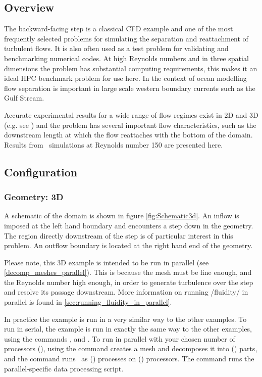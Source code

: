 \subsection{Overview}
The backward-facing step is a classical CFD example and one of the most frequently selected
problems for simulating the separation and reattachment of turbulent flows.
It is also often used as a test problem for validating and benchmarking numerical codes.
At high Reynolds numbers and in three spatial dimensions the problem has substantial
computing requirements, this makes it an ideal HPC benchmark problem for use here.
In the context of ocean modelling flow separation is important
in large scale western boundary currents such as the Gulf Stream.

Accurate experimental results for a wide range of flow regimes exist
in 2D and 3D
(e.g. see \cite{armaly1983}) and the problem has several important flow
characteristics, such as the downstream length at which the flow reattaches
with the bottom of the domain. Results from \fluidity\ simulations at Reynolds number 150
are presented here.


\subsection{Configuration}
\subsubsection{Geometry: 3D}
A schematic of the domain is shown in figure \ref{fig:Schematic3d}.
An inflow is imposed at the left hand boundary and encounters a step
down in the geometry. The region directly downstream of the step is
of particular interest in this problem. An outflow boundary is located at the
right hand end of the geometry.

Please note, this 3D example is intended to be run in parallel (see \ref{decomp_meshes_parallel}).
This is because the mesh must be fine enough, and the Reynolds number high enough, in order to
generate turbulence over the step and resolve its passage downstream. More information on running
/fluidity/ in parallel is found in \ref{sec:running_fluidity_in_parallel}.

In practice the example is run in a very similar way to the other examples.
To run in serial, the example is run in exactly the same way to the other examples, using
the commands ,  and .
To run in parallel with your chosen number of processors (), using the command
 creates a mesh and decomposes it into () parts, and
the command  runs \fluidity\ as () processes on () processors.
The command  runs the parallel-specific data processing script.

